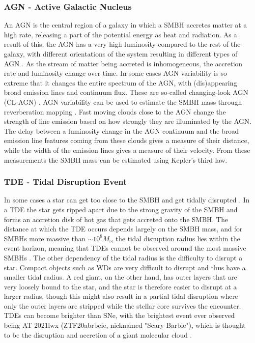 \documentclass[a4paper,oneside,12pt, class=Latex/Classes/PhDthesisPSnPDF, crop=false]{standalone}
\begin{document}
\subsubsection{AGN - Active Galactic Nucleus}
An AGN is the central region of a galaxy in which a SMBH accretes matter at a high rate, releasing a part of the potential energy as heat and radiation. As a result of this, the AGN has a very high luminosity compared to the rest of the galaxy, with different orientations of the system resulting in different types of AGN \citep{Antonucci_1993_AGN, Urry_1995_AGN}. As the stream of matter being accreted is inhomogeneous, the accretion rate and luminosity change over time. In some cases AGN variability is so extreme that it changes the entire spectrum of the AGN, with (dis)appearing broad emission lines and continuum flux. These are so-called changing-look AGN (CL-AGN) \citep[see][for a review]{CLAGN}. AGN variability can be used to estimate the SMBH mass through reverberation mapping \citep{Reverberation_mapping, Reverberation_Peterson}. Fast moving clouds close to the AGN change the strength of line emission based on how strongly they are illuminated by the AGN. The delay between a luminosity change in the AGN continuum and the broad emission line features coming from these clouds gives a measure of their distance, while the width of the emission lines gives a measure of their velocity. From these measurements the SMBH mass can be estimated using Kepler's third law.


\subsubsection{TDE - Tidal Disruption Event}
In some cases a star can get too close to the SMBH and get tidally disrupted \citep{Rees_1988_TDE, Strubbe_2009_TDE}. In a TDE the star gets ripped apart due to the strong gravity of the SMBH and forms an accretion disk of hot gas that gets accreted onto the SMBH. The distance at which the TDE occurs depends largely on the SMBH mass, and for SMBHs more massive than $\sim10^8 M_\odot$ the tidal disruption radius lies within the event horizon, meaning that TDEs cannot be observed around the most massive SMBHs \citep{Hills_mass}. The other dependency of the tidal radius is the difficulty to disrupt a star. Compact objects such as WDs are very difficult to disrupt and thus have a smaller tidal radius. A red giant, on the other hand, has outer layers that are very loosely bound to the star, and the star is therefore easier to disrupt at a larger radius, though this might also result in a partial tidal disruption where only the outer layers are stripped while the stellar core survives the encounter. TDEs can become brighter than SNe, with the brightest event ever observed being AT 2021lwx (ZTF20abrbeie, nicknamed "Scary Barbie"), which is thought to be the disruption and accretion of a giant molecular cloud \citep{Scary_Barbie, 2021lwx_Wiseman}.
\end{document}
